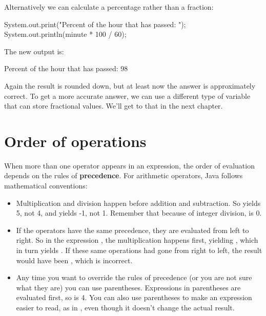 Alternatively we can calculate a percentage rather than a fraction:

\begin{code}
    System.out.print("Percent of the hour that has passed: ");
    System.out.println(minute * 100 / 60);
\end{code}

The new output is:

\begin{stdout}
Percent of the hour that has passed: 98
\end{stdout}

Again the result is rounded down, but at least now the answer is approximately correct.
To get a more accurate answer, we can use a different type of variable that can store fractional values.
We'll get to that in the next chapter.


\section{Order of operations}


When more than one operator appears in an expression, the order of evaluation depends on the rules of {\bf precedence}.
For arithmetic operators, Java follows mathematical conventions:

\begin{itemize}

\item Multiplication and division happen before addition and subtraction.
So  yields 5, not 4, and  yields -1, not 1.
Remember that because of integer division,  is 0.

\item If the operators have the same precedence, they are evaluated from left to right.
So in the expression , the multiplication happens first, yielding , which in turn yields .
If these same operations had gone from right to left, the result would have been , which is incorrect.

\item Any time you want to override the rules of precedence (or you are not sure what they are) you can use parentheses.
Expressions in parentheses are evaluated first, so  is 4.
You can also use parentheses to make an expression easier to read, as in , even though it doesn't change the actual result.

\end{itemize}

